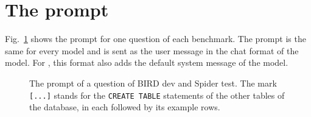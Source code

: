 \section{The prompt}\label{sup:prompt}

Fig.~\ref{fig:prompt} shows the prompt for one question of each
benchmark. The prompt is the same for every model and is sent as the
user message in the chat format of the model. For , this
format also adds the default system message of the model.

\begin{figure}[!ht]

\noindent{\ttfamily\fontsize{7}{8}\selectfont [...]}

\medskip
{}

\noindent{\ttfamily\fontsize{7}{8}\selectfont [...]}

\caption{The prompt of a question of  BIRD dev and  Spider test.
The mark \texttt{[...]} stands for the \texttt{CREATE TABLE} statements
of the other tables of the database, in  each followed by its example
rows.}\label{fig:prompt}
\end{figure}
